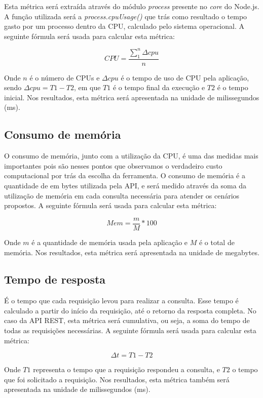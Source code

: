 Esta métrica será extraída através do módulo \textit{process} presente no \textit{core} do Node.js. A função utilizada será a \textit{process.cpuUsage()} que trás como resultado o tempo gasto por um processo dentro da CPU, calculado pelo sistema operacional. A seguinte fórmula será usada para calcular esta métrica: 

$$ CPU = \frac{\sum\limits_{1}^{n} \Delta cpu}{n} $$

Onde $n$ é o número de CPUs e $\Delta cpu$ é o tempo de uso de CPU pela aplicação, sendo $\Delta cpu = T1 - T2$, em que $T1$ é o tempo final da execução e $T2$ é o tempo inicial. Nos resultados, esta métrica será apresentada na unidade de milissegundos (ms).

\subsection*{Consumo de memória}

O consumo de memória, junto com a utilização da CPU, é uma das medidas mais importantes pois são nesses pontos que observamos o verdadeiro custo computacional por trás da escolha da ferramenta. O consumo de memória é a quantidade de em bytes utilizada pela API, e será medido através da soma da utilização de memória em cada consulta necessária para atender os cenários propostos. A seguinte fórmula será usada para calcular esta métrica: 

$$ Mem = \frac{m}{M}*100 $$

Onde $m$ é a quantidade de memória usada pela aplicação e $M$ é o total de memória. Nos resultados, esta métrica será apresentada na unidade de megabytes.

\subsection*{Tempo de resposta}

É o tempo que cada requisição levou para realizar a consulta. Esse tempo é calculado a partir do início da requisição, até o retorno da resposta completa. No caso da API REST, esta métrica será cumulativa, ou seja, a soma do tempo de todas as requisições necessárias. A seguinte fórmula será usada para calcular esta métrica: 

$$ \Delta t = T1 - T2 $$

Onde $T1$ representa o tempo que a requisição respondeu a consulta, e $T2$ o tempo que foi solicitado a requisição. Nos resultados, esta métrica também será apresentada na unidade de milissegundos (ms).


